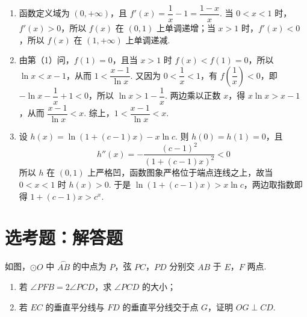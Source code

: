 \begin{solution}
\begin{enumerate}
\item 函数定义域为 \((0,+\infty)\)，且 \(f'(x)=\dfrac1x-1=\dfrac{1-x}{x}\). 当 \(0<x<1\) 时，\(f'(x)>0\)，所以 \(f(x)\) 在 \((0,1)\) 上单调递增；当 \(x>1\) 时，\(f'(x)<0\)，所以 \(f(x)\) 在 \((1,+\infty)\) 上单调递减.
\item 由第（1）问，\(f(1)=0\)，且当 \(x>1\) 时 \(f(x)<f(1)=0\)，所以 \(\ln x<x-1\)，从而 \(1<\dfrac{x-1}{\ln x}\). 又因为 \(0<\dfrac1x<1\)，有 \(f\left(\dfrac1x\right)<0\)，即 \(-\ln x-\dfrac1x+1<0\)，所以 \(\ln x>1-\dfrac1x\). 两边乘以正数 \(x\)，得 \(x\ln x>x-1\)，从而 \(\dfrac{x-1}{\ln x}<x\). 综上，\(1<\dfrac{x-1}{\ln x}<x\).
\item 设 \(h(x)=\ln\left(1+(c-1)x\right)-x\ln c\). 则 \(h(0)=h(1)=0\)，且
\[
h''(x)=-\frac{(c-1)^2}{\left(1+(c-1)x\right)^2}<0
\]
所以 \(h\) 在 \((0,1)\) 上严格凹，函数图象严格位于端点连线之上，故当 \(0<x<1\) 时 \(h(x)>0\). 于是 \(\ln\left(1+(c-1)x\right)>x\ln c\)，两边取指数即得 \(1+(c-1)x>c^x\).
\end{enumerate}
\end{solution}

\section{选考题：解答题}

\begin{problem}
如图，\(\odot O\) 中 \(\overset{\frown}{AB}\) 的中点为 \(P\)，弦 \(PC\)，\(PD\) 分别交 \(AB\) 于 \(E\)，\(F\) 两点.

\begin{enumerate}
\item 若 \(\angle PFB=2\angle PCD\)，求 \(\angle PCD\) 的大小；
\item 若 \(EC\) 的垂直平分线与 \(FD\) 的垂直平分线交于点 \(G\)，证明 \(OG\perp CD\).
\end{enumerate}

\begingroup
{}
\endgroup
\end{problem}

